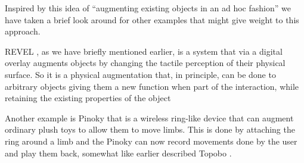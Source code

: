 
Inspired by this idea of ``augmenting existing objects in an ad hoc fashion'' we have taken a brief look around for other examples that might give weight to this approach.

REVEL \citep{bau2013revel}, as we have briefly mentioned earlier, is a system that via a digital overlay augments objects by changing the tactile perception of their physical surface.
So it is a physical augmentation that, in principle, can be done to arbitrary objects giving them a new function when part of the interaction, while retaining the existing properties of the object 

Another example is Pinoky \citep{sugiura2012pinoky} that is a wireless ring-like device that can augment ordinary plush toys to allow them to move limbs.
This is done by attaching the ring around a limb and the Pinoky can now record movements done by the user and play them back, somewhat like earlier described Topobo \citep{raffle2004topobo}.

